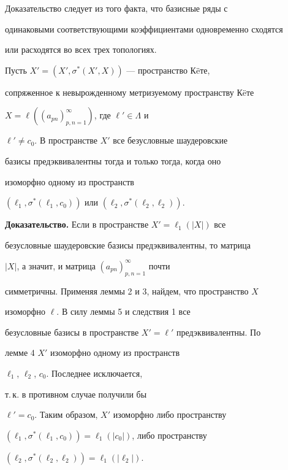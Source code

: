 Доказательство следует из того факта, что базисные ряды с


одинаковыми соответствующими коэффициентами одновременно сходятся


или расходятся во всех трех топологиях.





\begin{thm}


Пусть $X'=(X',\sigma^*(X',X))$ --- пространство К\"eте,


сопряженное к невырожденному метризуемому пространству К\"eте


$X=\ell((a_{pn})^\infty_{p,n=1})$, где $\ell'\in\Lambda$ и


$\ell'\ne c_0$. В пространстве $X'$ все безусловные шаудеровские


базисы предэквивалентны тогда и только тогда, когда оно


изоморфно одному из пространств


$(\ell_1,\sigma^*(\ell_1, c_0))$ или $(\ell_2,\sigma^*(\ell_2,\ell_2))$.


\end{thm}





{\bf Доказательство.} Если в пространстве $X'=\ell_1(|X|)$ все


безусловные шаудеровские базисы предэквивалентны, то матрица


$|X|$, а значит, и матрица $(a_{pn})^\infty_{p,n=1}$ почти


симметричны. Применяя леммы 2 и 3, найдем, что пространство $X$


изоморфно $\ell$. В силу леммы 5 и следствия 1 все


безусловные базисы в пространстве $X'=\ell'$ предэквивалентны. По


лемме 4\; $X'$ изоморфно одному из пространств


$\ell_1$, $\ell_2$, $c_0$. Последнее исключается,


т.\,к. в противном случае получили бы


$\ell'=c_0$. Таким образом, $X'$ изоморфно либо пространству


$(\ell_1,\sigma^*(\ell_1,c_0))=\ell_1(|c_0|)$, либо пространству


$(\ell_2,\sigma^*(\ell_2,\ell_2))=\ell_1(|\ell_2|)$.





